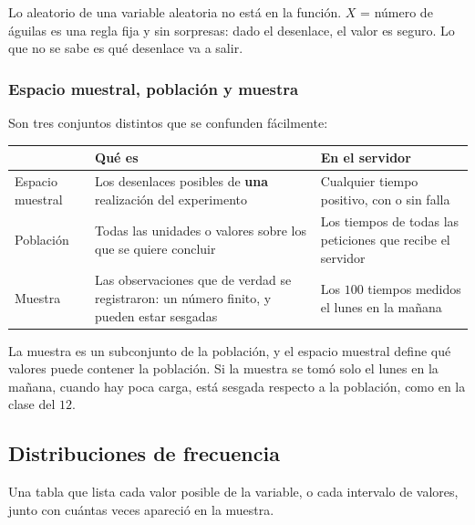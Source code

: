 \documentclass[11pt,letterpaper]{article}
\begin{document}
\begin{ojo}
    Lo aleatorio de una variable aleatoria no está en la función.
    $X$ = número de águilas es una regla fija y sin sorpresas: dado el
    desenlace, el valor es seguro. Lo que no se sabe es qué desenlace
    va a salir.
\end{ojo}

\subsubsection*{Espacio muestral, población y muestra}

Son tres conjuntos distintos que se confunden fácilmente:

\begin{center}
\small
\begin{tabular}{l>{\raggedright\arraybackslash}p{5.4cm}%
                 >{\raggedright\arraybackslash}p{5.2cm}}
    \toprule
    & \textbf{Qué es} & \textbf{En el servidor} \\
    \midrule
    Espacio muestral & Los desenlaces posibles de \textbf{una}
                       realización del experimento
                     & Cualquier tiempo positivo, con o sin falla \\
    \addlinespace
    Población & Todas las unidades o valores sobre los que se quiere
                concluir
              & Los tiempos de todas las peticiones que recibe el
                servidor \\
    \addlinespace
    Muestra & Las observaciones que de verdad se registraron: un
              número finito, y pueden estar sesgadas
            & Los $100$ tiempos medidos el lunes en la mañana \\
    \bottomrule
\end{tabular}
\end{center}

La muestra es un subconjunto de la población, y el espacio muestral
define qué valores puede contener la población. Si la muestra se tomó
solo el lunes en la mañana, cuando hay poca carga, está sesgada
respecto a la población, como en la clase del $12$.


\subsection*{Distribuciones de frecuencia}

\begin{definicion}
    Una tabla que lista cada valor posible de la variable, o cada
    intervalo de valores, junto con cuántas veces apareció en la
    muestra.
\end{definicion}
\end{document}
